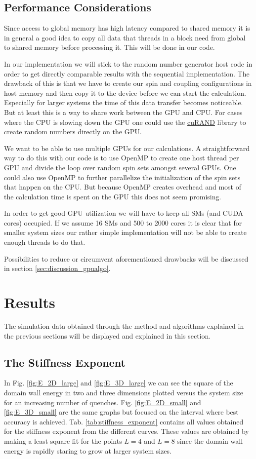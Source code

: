 \documentclass[paper=a4, fontsize=11pt]{scrartcl} %
\numberwithin{equation}{section} %
\numberwithin{figure}{section} %
\numberwithin{table}{section} %
\begin{document}
\subsection{Performance Considerations}
Since access to global memory has high latency compared to shared memory it is in general a good idea to copy all data that threads in a block need from global to shared memory before processing it. This will be done in our code.

In our implementation we will stick to the random number generator host code in order to get directly comparable results with the sequential implementation. The drawback of this is that we have to create our spin and coupling configurations in host memory and then copy it to the device before we can start the calculation. Especially for larger systems the time of this data transfer becomes noticeable. But at least this is a way to share work between the GPU and CPU. For cases where the CPU is slowing down the GPU one could use the \href{http://docs.nvidia.com/cuda/curand/index.html}{cuRAND} library to create random numbers directly on the GPU.

We want to be able to use multiple GPUs for our calculations. A straightforward way to do this with our code is to use OpenMP to create one host thread per GPU and divide the loop over random spin sets amongst several GPUs. One could also use OpenMP to further parallelize the initialization of the spin sets that happen on the CPU. But because OpenMP creates overhead and most of the calculation time is spent on the GPU this does not seem promising.

In order to get good GPU utilization we will have to keep all SMs (and CUDA cores) occupied. If we assume 16 SMs and 500 to 2000 cores it is clear that for smaller system sizes our rather simple implementation will not be able to create enough threads to do that.

Possibilities to reduce or circumvent aforementioned drawbacks will be discussed in section \ref{sec:discussion_gpualgo}.

\section{Results}
\label{sec:results}
The simulation data obtained through the method and algorithms explained in the previous sections will be displayed and explained in this section.

\subsection{The Stiffness Exponent}
In Fig. \ref{fig:E_2D_large} and \ref{fig:E_3D_large} we can see the square of the domain wall energy in two and three dimensions plotted versus the system size for an increasing number of quenches. Fig. \ref{fig:E_2D_small} and \ref{fig:E_3D_small} are the same graphs but focused on the interval where best accuracy is achieved. Tab. \ref{tab:stiffness_exponent} contains all values obtained for the stiffness exponent from the different curves. These values are obtained by making a least square fit for the points $L=4$ and $L=8$ since the domain wall energy is rapidly staring to grow at larger system sizes.
\end{document}
